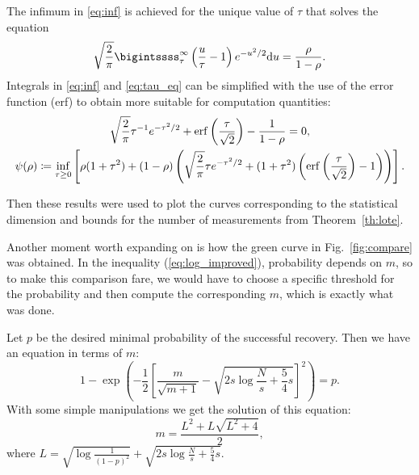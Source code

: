 The infimum in \ref{eq:inf} is achieved for the unique value of $\tau$ that solves the equation
\begin{equation} \label{eq:tau_eq}
    \sqrt{\frac{2}{\pi}}\bigintssss_{\tau}^{\infty} \left( \frac{u}{\tau} - 1 \right) e^{-u^2/2} \mathrm{d} u = \frac{\rho}{1 - \rho}.
\end{equation}
Integrals in \ref{eq:inf} and \ref{eq:tau_eq} can be simplified with the use of the error function (erf) to obtain more suitable
for computation quantities:
    \begin{gather}
        \sqrt{\frac{2}{\pi}}\tau^{-1}e^{-\tau^2/2} + \operatorname{erf}\left( \frac{\tau}{\sqrt{2}} \right) - \frac{1}{1-\rho} = 0,
        \\
        \psi(\rho) \coloneq \inf_{\tau \geq 0} \left[ \rho (1+\tau^2) +
        (1-\rho) \left( \sqrt{\frac{2}{\pi}} \tau e^{-\tau^2/2} + (1+\tau^2)\left(\mathrm{erf}\left(\frac{\tau}{\sqrt{2}}\right) - 1\right) \right) \right].
    \end{gather}

Then these results were used to plot the curves corresponding to the statistical dimension and
bounds for the number of measurements from Theorem~\ref{th:lote}.

Another moment worth expanding on is how the green curve in Fig.~\ref{fig:compare} was obtained.
In the inequality (\ref{eq:log_improved}), probability depends on $m$, so to make this comparison fare,
we would have to choose a specific threshold for the probability and then compute the corresponding $m$, which is
exactly what was done.

Let $p$ be the desired minimal probability of the successful recovery.
Then we have an equation in terms of $m$:
\[ 1 - \exp \left( - \frac{1}{2} \left[\frac{m}{\sqrt{m+1}} - \sqrt {2s \log \frac{N}{s}+\frac{5}{4}s}\right]^2 \right) = p.\]
With some simple manipulations we get the solution of this equation:
\[ m = \frac{L^2 + L\sqrt{L^2 + 4}}{2}, \]
where $L = \sqrt{\log \frac{1}{(1-p)^2}} + \sqrt {2s \log \frac{N}{s}+\frac{5}{4}s}$.
